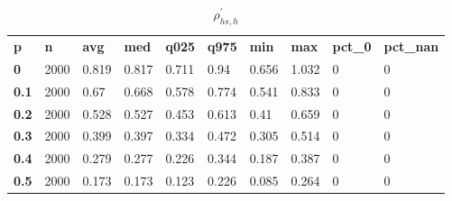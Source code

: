 \begin{table}[h]
 \centering 
\footnotesize
\caption{$\rho_{hs,h}^\prime $}
\label{tab:alphahsh}
\begin{tabular}[h]{| l l l l l l l l l l|
    } \hline
\textbf{ p} & \textbf{ n} & \textbf{ avg} & \textbf{ med} & \textbf{ q025} & \textbf{ q975} & \textbf{ min} & \textbf{ max} & \textbf{ pct\_0} & \textbf{ pct\_nan}
           \\
  \textbf{  0} & 2000 & 0.819 & 0.817 & 0.711 &  0.94 & 0.656 & 1.032 & 0 & 0
           \\
  \textbf{0.1} & 2000 &  0.67 & 0.668 & 0.578 & 0.774 & 0.541 & 0.833 & 0 & 0
           \\
  \textbf{0.2} & 2000 & 0.528 & 0.527 & 0.453 & 0.613 &  0.41 & 0.659 & 0 & 0
           \\
  \textbf{0.3} & 2000 & 0.399 & 0.397 & 0.334 & 0.472 & 0.305 & 0.514 & 0 & 0
           \\
  \textbf{0.4} & 2000 & 0.279 & 0.277 & 0.226 & 0.344 & 0.187 & 0.387 & 0 & 0
           \\
  \textbf{0.5} & 2000 & 0.173 & 0.173 & 0.123 & 0.226 & 0.085 & 0.264 & 0 & 0
           \\
 \hline \end{tabular}
 \end{table}
